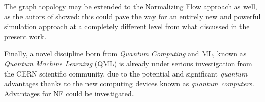 The graph topology may be extended to the Normalizing Flow approach as well, as the autors of \cite{https://doi.org/10.48550/arxiv.2105.09016} showed: this could pave the way for an entirely new and powerful simulation approach at a completely different level from what discussed in the present work.

Finally, a novel discipline born from \emph{Quantum Computing} and ML, known as \emph{Quantum Machine Learning} (QML) is already under serious investigation from the CERN scientific community, due to the potential and significant \emph{quantum} advantages thanks to the new computing devices known as \emph{quantum computer}s. 
Advantages for NF could be investigated.